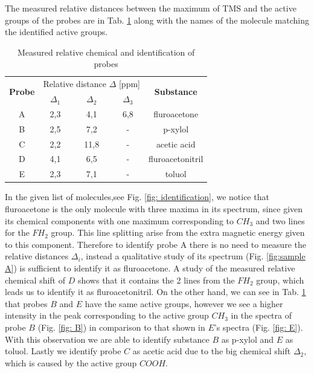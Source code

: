 The measured relative distances between the maximum of TMS and the active groups of the probes are in Tab. \ref{tab: identification} along with the names of the molecule matching the identified active groups.
\begin{table}[!htbp]
 \begin{center}
  \caption{ Measured relative chemical and identification of probes}
  \label{tab: identification}
  \begin{tabular}{|c||c|c|c|c|}
  \hline
 	\multirow{2}{*}{\textbf{Probe}} & \multicolumn{3}{c}{Relative distance $\Delta$ [ppm]} &\multirow{2}{*}{ \textbf{Substance}} \\
								   &	 $\Delta_1$ & $\Delta_2$ &  $\Delta_3$ & \\
\hline
\hline
 	A & 2,3 & 4,1 & 6,8& fluroacetone \\
 	B & 2,5 & 7,2 & - & p-xylol \\
 	C & 2,2 & 11,8& - & acetic acid \\
 	D & 4,1 & 6,5 & - & fluroacetonitril \\
 	E & 2,3 & 7,1 & - & toluol \\
 	\hline
  \end{tabular}
 \end{center}
\end{table}
In the given list of molecules,see Fig. \ref{fig: identification}, we notice that fluroacetone is the only molecule with three maxima in its spectrum, since given its chemical components with one maximum corresponding to $CH_3$ and two lines for the $FH_2$ group. This line splitting arise from the extra magnetic energy given to this component. Therefore to identify probe A there is no need to measure the relative distances $\Delta_i$, instead a qualitative study of its spectrum (Fig. \ref{fig:sample A}) is sufficient to identify it as fluroacetone. 
A study of the measured relative chemical shift of $D$ shows that it contains the 2 lines from the $FH_2$ group, which leads us to identify it as fluroacetonitril.  
On the other hand, we can see in Tab. \ref{tab: identification} that probes $B$ and $E$ have the same active groups, however we see a higher intensity in the peak corresponding to the active group $CH_3$ in the spectra of probe $B$ (Fig. \ref{fig: B}) in comparison to that shown in $E$'s spectra (Fig. \ref{fig: E}). With this observation we are able to identify substance $B$ as p-xylol and $E$ as toluol. 
Lastly we identify probe $C$ as acetic acid due to the big chemical shift $\Delta_2$, which is caused by the active group $COOH$.
